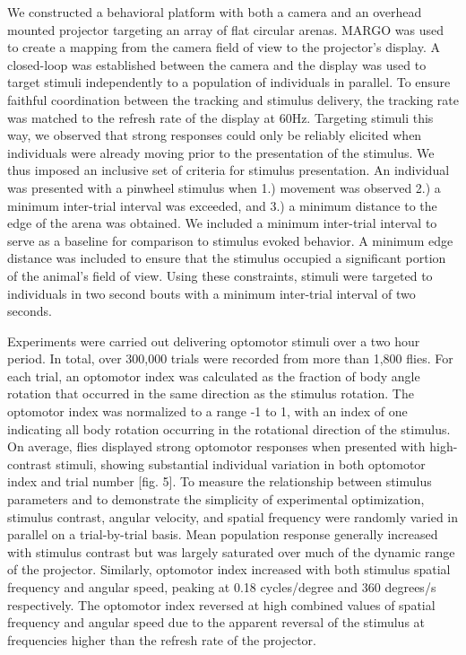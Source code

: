 \documentclass[10pt]{article}
\begin{document}
\begin{multicols}{2}
We constructed a behavioral platform with both a camera and an overhead mounted projector targeting an array of flat circular arenas. MARGO was used to create a mapping from the camera field of view to the projector's display. A closed-loop was established between the camera and the display was used to target stimuli independently to a population of individuals in parallel. To ensure faithful coordination between the tracking and stimulus delivery, the tracking rate was matched to the refresh rate of the display at 60Hz. Targeting stimuli this way, we observed that strong responses could only be reliably elicited when individuals were already moving prior to the presentation of the stimulus. We thus imposed an inclusive set of criteria for stimulus presentation. An individual was presented with a pinwheel stimulus when 1.) movement was observed 2.) a minimum inter-trial interval was exceeded, and 3.) a minimum distance to the edge of the arena was obtained. We included a minimum inter-trial interval to serve as a baseline for comparison to stimulus evoked behavior. A minimum edge distance was included to ensure that the stimulus occupied a significant portion of the animal's field of view. Using these constraints, stimuli were targeted to individuals in two second bouts with a minimum inter-trial interval of two seconds. 

Experiments were carried out delivering optomotor stimuli over a two hour period. In total, over 300,000 trials were recorded from more than 1,800 flies. For each trial, an optomotor index was calculated as the fraction of body angle rotation that occurred in the same direction as the stimulus rotation. The optomotor index was normalized to a range -1 to 1, with an index of one indicating all body rotation occurring in the rotational direction of the stimulus. On average, flies displayed strong optomotor responses when presented with high-contrast stimuli, showing substantial individual variation in both optomotor index and trial number [fig. 5]. To measure the relationship between stimulus parameters and to demonstrate the simplicity of experimental optimization, stimulus contrast, angular velocity, and spatial frequency were randomly varied in parallel on a trial-by-trial basis. Mean population response generally increased with stimulus contrast but was largely saturated over much of the dynamic range of the projector. Similarly, optomotor index increased with both stimulus spatial frequency and angular speed, peaking at 0.18 cycles/degree and 360 degrees/s respectively. The optomotor index reversed at high combined values of spatial frequency and angular speed due to the apparent reversal of the stimulus at frequencies higher than the refresh rate of the projector.



\end{multicols}
\end{document}
